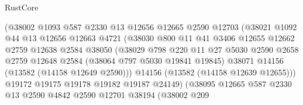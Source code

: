 \begin{lexlean}{RustCore}
\begin{coremodule}
                              (@38002
                                @1093
                                @587
                                @2330
                                @13
                                @12656
                                @12665
                                @2590
                                @12703
                                (@38021
                                  @1092
                                  @44
                                  @13
                                  @12656
                                  @12663
                                  @4721
                                  (@38030
                                    @800
                                    @11
                                    @41
                                    @3406
                                    @12655
                                    @12662
                                    @2759
                                    @12638
                                    @2584
                                    @38050
                                    (@38029
                                      @798
                                      @220
                                      @11
                                      @27
                                      @5030
                                      @2590
                                      @2658
                                      @2759
                                      @12648
                                      @2584
                                      (@38064 @797 @5030 @19841 @19845)
                                      @38071
                                      @14156
                                      (@13582 (@14158 @12649 @2590)))
                                    @14156
                                    (@13582 (@14158 @12639 @12655)))
                                  @19172
                                  @19175
                                  @19178
                                  @19182
                                  @19187
                                  @24149)
                                (@38095
                                  @12665
                                  @587
                                  @2330
                                  @13
                                  @2590
                                  @4842
                                  @2590
                                  @12701
                                  @38194
                                  (@38002
                                    @209

\end{coremodule}
\end{lexlean}
